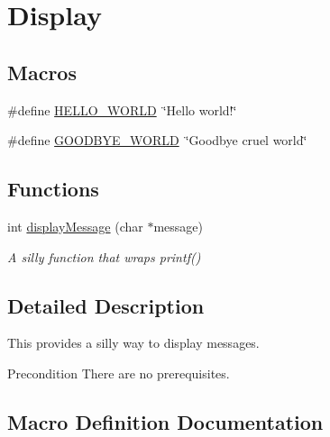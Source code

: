 \hypertarget{group__disply}{}\section{Display}
\label{group__disply}
\subsection*{Macros}
\begin{DoxyCompactItemize}
\item 
\#define \hyperlink{group__disply_gafc60fb36321ac33109a111c3947433df}{H\+E\+L\+L\+O\+\_\+\+W\+O\+R\+L\+D}~\char`\"{}Hello world!\char`\"{}
\item 
\#define \hyperlink{group__disply_ga9e28d90e086229117a7a49b6f5f12342}{G\+O\+O\+D\+B\+Y\+E\+\_\+\+W\+O\+R\+L\+D}~\char`\"{}Goodbye cruel world\char`\"{}
\end{DoxyCompactItemize}
\subsection*{Functions}
\begin{DoxyCompactItemize}
\item 
int \hyperlink{group__disply_ga277af9a0b9a5b76b8d9d41218a0727ba}{display\+Message} (char $\ast$message)
\begin{DoxyCompactList}\small\item\em A silly function that wraps printf() \end{DoxyCompactList}\end{DoxyCompactItemize}


\subsection{Detailed Description}
This provides a silly way to display messages. \begin{DoxyPrecond}{Precondition}
There are no prerequisites. 
\end{DoxyPrecond}


\subsection{Macro Definition Documentation}
\hypertarget{group__disply_ga9e28d90e086229117a7a49b6f5f12342}{}
